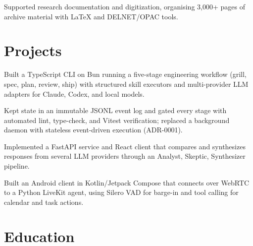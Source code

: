\documentclass{../../../templates/v3/resume-openfont}
\begin{document}
\begin{resumeitemize}
\item Supported research documentation and digitization, organising 3{,}000+ pages of archive material with LaTeX and DELNET/OPAC tools.
\end{resumeitemize}

\section{Projects}
\begin{resumeitemize}
\item Built a TypeScript CLI on Bun running a five-stage engineering workflow (grill, spec, plan, review, ship) with structured skill executors and multi-provider LLM adapters for Claude, Codex, and local models.
\item Kept state in an immutable JSONL event log and gated every stage with automated lint, type-check, and Vitest verification; replaced a background daemon with stateless event-driven execution (ADR-0001).
\end{resumeitemize}

\begin{resumeitemize}
\item Implemented a FastAPI service and React client that compares and synthesizes responses from several LLM providers through an Analyst, Skeptic, Synthesizer pipeline.
\end{resumeitemize}

\begin{resumeitemize}
\item Built an Android client in Kotlin/Jetpack Compose that connects over WebRTC to a Python LiveKit agent, using Silero VAD for barge-in and tool calling for calendar and task actions.
\end{resumeitemize}

\section{Education}
\end{document}
